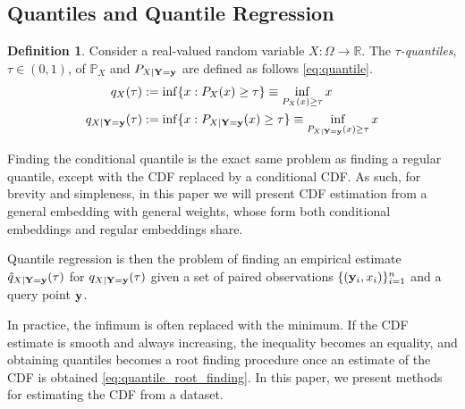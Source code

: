 \documentclass[twoside]{article} \usepackage{aistats2017}
\theoremstyle{definition}
\newtheorem{definition}{Definition}[section]
\theoremstyle{theorem}
\newcommand{\rv}[1]{{#1}}
\newcommand{\ds}[1]{\tilde{#1}}
\begin{document}
			
		
	\subsection{Quantiles and Quantile Regression}
	\label{sec:background:quantiles}

		\begin{definition} \label{def:quantile}
			\citep{takeuchi2006nonparametric}
			Consider a real-valued random variable $\rv{X} : \Omega \to \mathbb{R}$. The \textit{$\tau$-quantiles}, $\tau \in (0, 1)$, of $\mathbb{P}_{\rv{X}}$ and $P_{\rv{X} | \bvec{\rv{Y}} = \bvec{y}}$ are defined as follows \eqref{eq:quantile}.
			\begin{equation}
				\begin{aligned}
					q_{\rv{X}}(\tau) &:= \inf\{x : P_{\rv{X}}(x) \geq \tau\} \equiv \inf_{P_{\rv{X}}(x) \geq \tau} x \\
					q_{\rv{X} | \bvec{\rv{Y}} = \bvec{y}}(\tau) &:= \inf\{x : P_{\rv{X} | \bvec{\rv{Y}} = \bvec{y}}(x) \geq \tau\} \equiv \inf_{P_{\rv{X} | \bvec{\rv{Y}} = \bvec{y}}(x) \geq \tau} x
				\end{aligned}
			\label{eq:quantile}
			\end{equation}
		\end{definition}

		Finding the conditional quantile is the exact same problem as finding a regular quantile, except with the CDF replaced by a conditional CDF. As such, for brevity and simpleness, in this paper we will present CDF estimation from a general embedding with general weights, whose form both conditional embeddings and regular embeddings share.
		
		Quantile regression is then the problem of finding an empirical estimate $\hat{q}_{\rv{X} | \bvec{\rv{Y}} = \bvec{y}}(\tau)$ for $q_{\rv{X} | \bvec{\rv{Y}} = \bvec{y}}(\tau)$ given a set of paired observations $\{(\mathbf{y}_{i}, x_{i})\}_{i = 1}^{n}$ and a query point $\mathbf{y}$.
		
		In practice, the infimum is often replaced with the minimum. If the CDF estimate is smooth and always increasing, the inequality becomes an equality, and obtaining quantiles becomes a root finding procedure once an estimate of the CDF is obtained \eqref{eq:quantile_root_finding}. In this paper, we present methods for estimating the CDF from a dataset.
		
\end{document}
